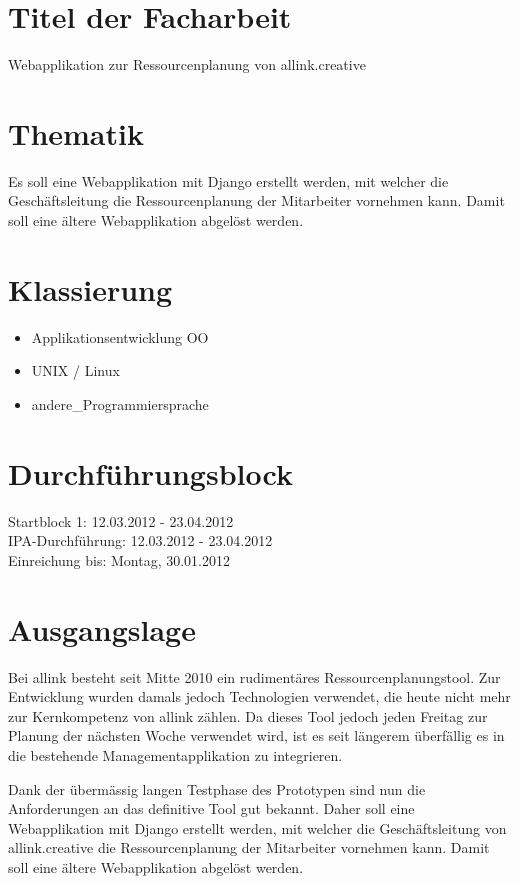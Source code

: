 \section{Titel der Facharbeit} 
Webapplikation zur Ressourcenplanung von allink.creative
    
\section{Thematik}
Es soll eine Webapplikation mit Django erstellt werden, mit welcher die Geschäftsleitung die Ressourcenplanung der Mitarbeiter vornehmen kann. 
Damit soll eine ältere Webapplikation abgelöst werden.
\section{Klassierung}
    
\begin{itemize}
    \item Applikationsentwicklung OO
    \item UNIX / Linux
    \item andere\_Programmiersprache
\end{itemize}
    
\section{Durchführungsblock}
Startblock 1: 12.03.2012 - 23.04.2012\\
IPA-Durchführung: 12.03.2012 - 23.04.2012\\
Einreichung bis: Montag, 30.01.2012\\
    
\section{Ausgangslage}
Bei allink besteht seit Mitte 2010 ein rudimentäres Ressourcenplanungstool. Zur Entwicklung wurden damals jedoch Technologien verwendet, die heute nicht mehr zur Kernkompetenz von allink zählen. Da dieses Tool jedoch jeden Freitag zur Planung der nächsten Woche verwendet wird, ist es seit längerem überfällig es in die bestehende Managementapplikation zu integrieren.

Dank der übermässig langen Testphase des Prototypen sind nun die Anforderungen an das definitive Tool gut bekannt. Daher soll eine Webapplikation mit Django erstellt werden, mit welcher die Geschäftsleitung von allink.creative die Ressourcenplanung der Mitarbeiter vornehmen kann. Damit soll eine ältere Webapplikation abgelöst werden.
    

